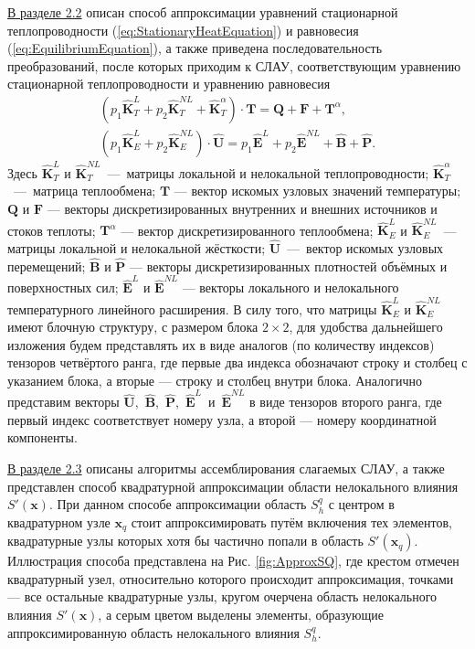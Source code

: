 \underline{В разделе 2.2} описан способ аппроксимации уравнений стационарной теплопроводности (\ref{eq:StationaryHeatEquation}) и равновесия (\ref{eq:EquilibriumEquation}), а также приведена последовательность преобразований, после которых приходим к СЛАУ, соответствующим уравнению стационарной теплопроводности и уравнению равновесия
\begin{gather}
	\label{eq:ThermalSLAE}
	\left( p_1 \widehat{\textbf{K}}^L_T + p_2 \widehat{\textbf{K}}^{NL}_T + \widehat{\textbf{K}}^{\alpha}_T \right) \cdot \textbf{T} = \textbf{Q} + \textbf{F} + \textbf{T}^{\alpha},
\\
	\label{eq:StressSLAE}
	\left( p_1 \widehat{\textbf{K}}^L_E + p_2 \widehat{\textbf{K}}^{NL}_E \right) \cdot \widehat{\textbf{U}} = p_1 \widehat{\textbf{E}}^L + p_2 \widehat{\textbf{E}}^{NL} + \widehat{\textbf{B}} + \widehat{\textbf{P}}.
\end{gather}
Здесь $\widehat{\textbf{K}}^L_T$ и $\widehat{\textbf{K}}^{NL}_T$~---~матрицы локальной и нелокальной теплопроводности;
$\widehat{\textbf{K}}^{\alpha}_T$~---~матрица теплообмена;
$\textbf{T}$ --- вектор искомых узловых значений температуры;
$\textbf{Q}$ и $\textbf{F}$ --- векторы дискретизированных внутренних и внешних источников и стоков теплоты;
$\textbf{T}^{\alpha}$ --- вектор дискретизированного теплообмена;
$\widehat{\textbf{K}}^L_E$ и $\widehat{\textbf{K}}^{NL}_E$~--- матрицы локальной и нелокальной жёсткости;
$\widehat{\textbf{U}}$~---~вектор искомых узловых перемещений;
$\widehat{\textbf{B}}$ и $\widehat{\textbf{P}}$ --- векторы дискретизированных плотностей объёмных и поверхностных сил;
$\widehat{\textbf{E}}^L$ и $\widehat{\textbf{E}}^{NL}$ --- векторы локального и нелокального температурного линейного расширения.
В силу того, что матрицы $\widehat{\textbf{K}}^L_E$ и $\widehat{\textbf{K}}^{NL}_E$ имеют блочную структуру, с размером блока $2 \times 2$, для удобства дальнейшего изложения будем представлять их в виде аналогов (по количеству индексов) тензоров четвёртого ранга, где первые два индекса обозначают строку и столбец с указанием блока, а вторые --- строку и столбец внутри блока.
Аналогично представим векторы \mbox{$\widehat{\textbf{U}}$, $\widehat{\textbf{B}}$, $\widehat{\textbf{P}}$, $\widehat{\textbf{E}}^L$ и $\widehat{\textbf{E}}^{NL}$} в виде тензоров второго ранга, где первый индекс соответствует номеру узла, а второй --- номеру координатной компоненты.

\underline{В разделе 2.3} описаны алгоритмы ассемблирования слагаемых СЛАУ, а также представлен способ квадратурной аппроксимации области нелокального влияния $S'(\boldsymbol{x})$. При данном способе аппроксимации область $S_h^q$ с центром в квадратурном узле $\boldsymbol{x}_q$ стоит аппроксимировать путём включения тех элементов, квадратурные узлы которых хотя бы частично попали в область $S'(\boldsymbol{x}_q)$. Иллюстрация способа представлена на Рис. \ref{fig:ApproxSQ}, где крестом отмечен квадратурный узел, относительно которого происходит аппроксимация, точками --- все остальные квадратурные узлы, кругом очерчена область нелокального влияния $S'(\boldsymbol{x})$, а серым цветом выделены элементы, образующие аппроксимированную область нелокального влияния $S_h^q$.

